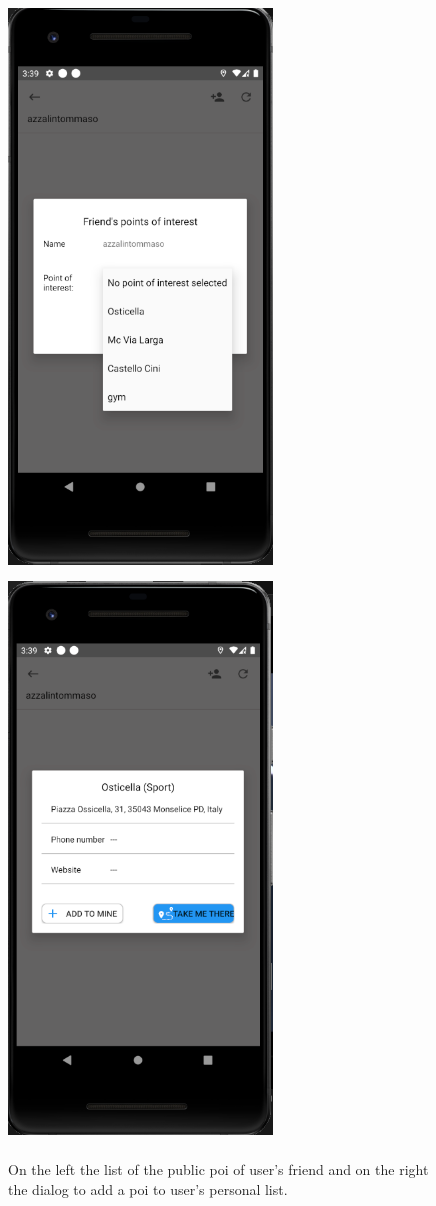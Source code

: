 \documentclass[../../main]{subfiles}
\begin{document}
\begin{figure}[H]
    \centering
    \includegraphics[width=70mm,height=150mm]{images/app/friend/friend_poi.png}
    \includegraphics[width=70mm,height=150mm]{images/app/friend/add_friend_poi.png}
    \caption{On the left the list of the public poi of user's friend and on the right the dialog to add a poi to user's personal list.}
\end{figure}
\end{document}
